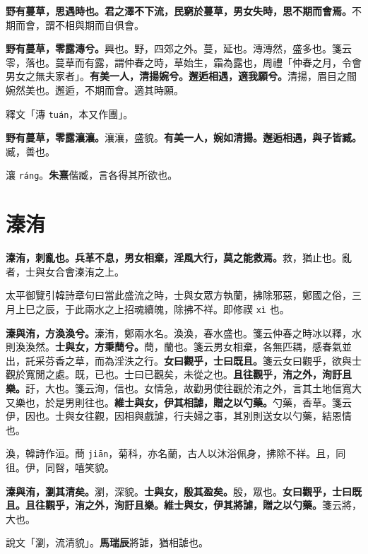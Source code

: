 
\textbf{野有蔓草，思遇時也。君之澤不下流，民窮於蔓草，男女失時，思不期而會焉。}{\footnotesize 不期而會，謂不相與期而自俱會。}

\textbf{野有蔓草，零露漙兮。}{\footnotesize 興也。野，四郊之外。蔓，延也。漙漙然，盛多也。箋云零，落也。蔓草而有露，謂仲春之時，草始生，霜為露也，周禮「仲春之月，令會男女之無夫家者」。}\textbf{有美一人，清揚婉兮。邂逅相遇，適我願兮。}{\footnotesize 清揚，眉目之間婉然美也。邂逅，不期而會。適其時願。}

\begin{quoting}釋文「漙 \texttt{tuán}，本又作團」。\end{quoting}

\textbf{野有蔓草，零露瀼瀼。}{\footnotesize 瀼瀼，盛貌。}\textbf{有美一人，婉如清揚。邂逅相遇，與子皆臧。}{\footnotesize 臧，善也。}

\begin{quoting}瀼 \texttt{ráng}。\textbf{朱熹}偕臧，言各得其所欲也。\end{quoting}

\section{溱洧}


\textbf{溱洧，刺亂也。兵革不息，男女相棄，淫風大行，莫之能救焉。}{\footnotesize 救，猶止也。亂者，士與女合會溱洧之上。}

\begin{quoting}太平御覽引韓詩章句曰當此盛流之時，士與女眾方執蘭，拂除邪惡，鄭國之俗，三月上巳之辰，于此兩水之上招魂續魄，除拂不祥。即修禊 \texttt{xì} 也。\end{quoting}

\textbf{溱與洧，方渙渙兮。}{\footnotesize 溱洧，鄭兩水名。渙渙，春水盛也。箋云仲春之時冰以釋，水則渙渙然。}\textbf{士與女，方秉蕳兮。}{\footnotesize 蕳，蘭也。箋云男女相棄，各無匹耦，感春氣並出，託采芬香之草，而為淫泆之行。}\textbf{女曰觀乎，士曰既且。}{\footnotesize 箋云女曰觀乎，欲與士觀於寬閒之處。既，已也。士曰已觀矣，未從之也。}\textbf{且往觀乎，洧之外，洵訏且樂。}{\footnotesize 訏，大也。箋云洵，信也。女情急，故勸男使往觀於洧之外，言其土地信寬大又樂也，於是男則往也。}\textbf{維士與女，伊其相謔，贈之以勺藥。}{\footnotesize 勺藥，香草。箋云伊，因也。士與女往觀，因相與戲謔，行夫婦之事，其別則送女以勺藥，結恩情也。}

\begin{quoting}渙，韓詩作洹。蕳 \texttt{jiān}，菊科，亦名蘭，古人以沐浴佩身，拂除不祥。且，同徂。伊，同㗨，嘻笑貌。\end{quoting}

\textbf{溱與洧，瀏其清矣。}{\footnotesize 瀏，深貌。}\textbf{士與女，殷其盈矣。}{\footnotesize 殷，眾也。}\textbf{女曰觀乎，士曰既且。且往觀乎，洧之外，洵訏且樂。維士與女，伊其將謔，贈之以勺藥。}{\footnotesize 箋云將，大也。}

\begin{quoting}說文「瀏，流清貌」。\textbf{馬瑞辰}將謔，猶相謔也。\end{quoting}

